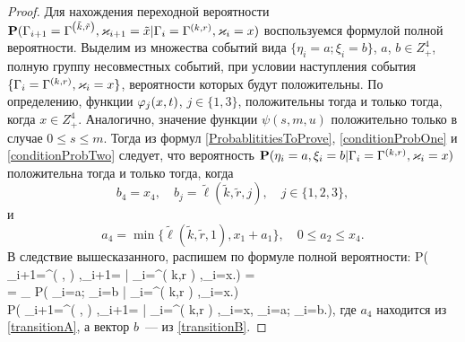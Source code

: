 \documentclass[a4paper,12pt,russian]{extarticle}
\newcommand{\G}{\Gamma}
\newcommand{\ga}[1]{\Gamma^{\left( #1 \right)} }
\renewcommand{\Pr}{{\mathbf P}}
\renewcommand{\P}[2]{\Pr\left( #1 \left| #2\right.\right)}
\begin{document}
\begin{proof}
Для нахождения переходной вероятности $\Pr(\G_{i+1}=\ga{\tilde{k},\tilde{r}},\vk_{i+1}=\tilde{x}|\G_{i}=\ga{k,r},\vk_i=x) $ воспользуемся формулой полной вероятности. Выделим из множества событий вида $\{\eta_i=a;\xi_i=b\}$, $a$, $b\in Z_+^4$, полную группу несовместных событий, при условии наступления события $\{\G_{i}=\ga{k,r},\vk_i=x\}$, вероятности которых будут положительны. По определению, функции $\varphi_j(x,t)$, $j\in \{1,3\}$, положительны тогда и только тогда, когда $x \in Z_+^4$. Аналогично, значение функции $\psi(s,m,u)$ положительно только в случае $0\leqslant s \leqslant m$. Тогда из формул \eqref{ProbablititiesToProve}, \eqref{conditionProbOne} и \eqref{conditionProbTwo} следует, что вероятность $\Pr(\eta_i=a, \xi_i=b|\G_{i}=\ga{k,r},\vk_i=x)$ положительна тогда и только тогда, когда 
\begin{equation}
b_4 = x_4, \quad b_j = \tilde{\ell}(\tilde{k},\tilde{r},j),\quad j\in\{1, 2, 3\},
\label{transitionB}
\end{equation}
и 
\begin{equation}
a_4=\min{\{\tilde{\ell}(\tilde{k},\tilde{r},1),x_1+a_1\}}, \quad  0\leqslant a_2 \leqslant x_4.
\label{transitionA}
\end{equation}
В следствие вышесказанного, распишем по формуле полной вероятности:
\mll
{
\P{\G_{i+1}=\ga{,},\vk_{i+1}=}{\G_{i}=\ga{k,r},\vk_i=x} = \\
= \sum_{} \P{\eta_i=a; \xi_i=b}{\G_{i}=\ga{k,r},\vk_i=x} \times \\ 
\times
\P{\G_{i+1}=\ga{,},\vk_{i+1}=}{\G_{i}=\ga{k,r},\vk_i=x, \eta_i=a; \xi_i=b},
}
где $a_4$ находится из \eqref{transitionA}, а вектор $b$~--- из \eqref{transitionB}.


\end{proof}
\end{document}
